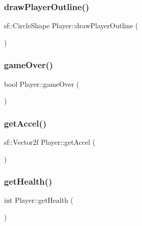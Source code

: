 \mbox{\label{class_player_ae47cf3c74c1e396d82c3266290871852}} 
\subsubsection{\texorpdfstring{draw\+Player\+Outline()}{drawPlayerOutline()}}
{\footnotesize\ttfamily sf\+::\+Circle\+Shape Player\+::draw\+Player\+Outline (\begin{DoxyParamCaption}{ }\end{DoxyParamCaption})}

\mbox{\label{class_player_a98dff5ba148838f3db6d9934048c33d9}} 
\subsubsection{\texorpdfstring{game\+Over()}{gameOver()}}
{\footnotesize\ttfamily bool Player\+::game\+Over (\begin{DoxyParamCaption}{ }\end{DoxyParamCaption})}

\mbox{\label{class_player_acd90a76e6bf73c5a7d2ff168965c3467}} 
\subsubsection{\texorpdfstring{get\+Accel()}{getAccel()}}
{\footnotesize\ttfamily sf\+::\+Vector2f Player\+::get\+Accel (\begin{DoxyParamCaption}{ }\end{DoxyParamCaption})}

\mbox{\label{class_player_abcb15d249bed9a4ab0ab86b52b0d747a}} 
\subsubsection{\texorpdfstring{get\+Health()}{getHealth()}}
{\footnotesize\ttfamily int Player\+::get\+Health (\begin{DoxyParamCaption}{ }\end{DoxyParamCaption})}

